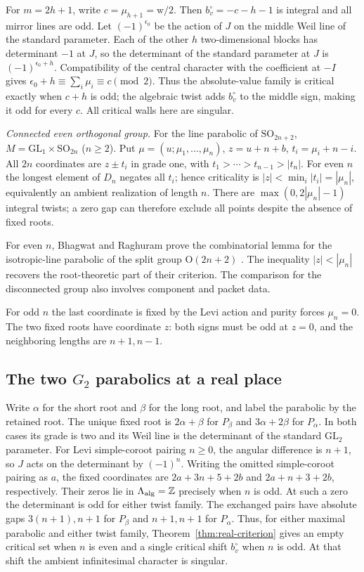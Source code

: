 \documentclass[12pt]{amsart}
\numberwithin{equation}{section}
\theoremstyle{plain}
\theoremstyle{definition}
\theoremstyle{remark}
\newcommand{\GL}{\mathrm{GL}}
\newcommand{\SO}{\mathrm{SO}}
\newcommand{\Z}{\mathbb{Z}}
\begin{document}
For $m=2h+1$, write $c=\mu_{h+1}=\mathrm{w}/2$. Then $b_v^\circ=-c-h-1$ is integral and all mirror lines are odd. Let $(-1)^{\epsilon_0}$ be the action of $J$ on the middle Weil line of the standard parameter. Each of the other $h$ two-dimensional blocks has determinant $-1$ at $J$, so the determinant of the standard parameter at $J$ is $(-1)^{\epsilon_0+h}$. Compatibility of the central character with the coefficient at $-I$ gives $\epsilon_0+h\equiv\sum_i\mu_i\equiv c\pmod2$. Thus the absolute-value family is critical exactly when $c+h$ is odd; the algebraic twist adds $b_v^\circ$ to the middle sign, making it odd for every $c$. All critical walls here are singular.

\emph{Connected even orthogonal group.} For the line parabolic of $\SO_{2n+2}$, $M=\GL_1\times\SO_{2n}$ ($n\ge2$). Put $\mu=(u;\mu_1,\ldots,\mu_n)$, $z=u+n+b$, $t_i=\mu_i+n-i$. All $2n$ coordinates are $z\pm t_i$ in grade one, with $t_1>\cdots>t_{n-1}>|t_n|$. For even $n$ the longest element of $D_n$ negates all $t_i$; hence criticality is $|z|<\min_i|t_i|=|\mu_n|$, equivalently an ambient realization of length $n$. There are $\max(0,2|\mu_n|-1)$ integral twists; a zero gap can therefore exclude all points despite the absence of fixed roots.

For even $n$, Bhagwat and Raghuram prove the combinatorial lemma for the isotropic-line parabolic of the split group $\mathrm O(2n+2)$ \cite[\S5.3]{BhagwatRaghuram2025}. The inequality $|z|<|\mu_n|$ recovers the root-theoretic part of their criterion. The comparison for the disconnected group also involves component and packet data. 

For odd $n$ the last coordinate is fixed by the Levi action and purity forces $\mu_n=0$. The two fixed roots have coordinate $z$: both signs must be odd at $z=0$, and the neighboring lengths are $n+1,n-1$. 

\subsection{The two \texorpdfstring{$G_2$}{G2} parabolics at a real place}\label{sec:g2-real-endpoints}
Write $\alpha$ for the short root and $\beta$ for the long root, and label the parabolic by the retained root. The unique fixed root is $2\alpha+\beta$ for $P_\beta$ and $3\alpha+2\beta$ for $P_\alpha$. In both cases its grade is two and its Weil line is the determinant of the standard $\GL_2$ parameter. For Levi simple-coroot pairing $n\ge0$, the angular difference is $n+1$, so $J$ acts on the determinant by $(-1)^n$. Writing the omitted simple-coroot pairing as $a$, the fixed coordinates are $2a+3n+5+2b$ and $2a+n+3+2b$, respectively. Their zeros lie in $\Lambda_{\rm alg}=\Z$ precisely when $n$ is odd. At such a zero the determinant is odd for either twist family. The exchanged pairs have absolute gaps $3(n+1),n+1$ for $P_\beta$ and $n+1,n+1$ for $P_\alpha$. Thus, for either maximal parabolic and either twist family, Theorem~\ref{thm:real-criterion} gives an empty critical set when $n$ is even and a single critical shift $b_v^\circ$ when $n$ is odd. At that shift the ambient infinitesimal character is singular.
\end{document}

